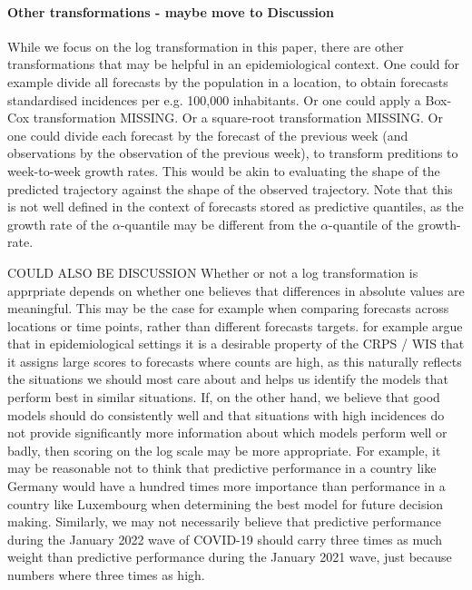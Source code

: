 \documentclass{article}
\begin{document}
\paragraph{Other transformations - maybe move to Discussion}
While we focus on the log transformation in this paper, there are other transformations that may be helpful in an epidemiological context. One could for example divide all forecasts by the population in a location, to obtain forecasts standardised incidences per e.g. 100,000 inhabitants. 
Or one could apply a Box-Cox transformation MISSING. 
Or a square-root transformation MISSING. 
Or one could divide each forecast by the forecast of the previous week (and observations by the observation of the previous week), to transform preditions to week-to-week growth rates. This would be akin to evaluating the shape of the predicted trajectory against the shape of the observed trajectory. Note that this is not well defined in the context of forecasts stored as predictive quantiles, as the growth rate of the $\alpha$-quantile may be different from the $\alpha$-quantile of the growth-rate. 



COULD ALSO BE DISCUSSION
Whether or not a log transformation is apprpriate depends on whether one believes that differences in absolute values are meaningful. This may be the case for example when comparing forecasts across locations or time points, rather than different forecasts targets. \cite{bracherEvaluatingEpidemicForecasts2021} for example argue that in epidemiological settings it is a desirable property of the CRPS / WIS that it assigns large scores to forecasts where counts are high, as this naturally reflects the situations we should most care about and helps us identify the models that perform best in similar situations. If, on the other hand, we believe that good models should do consistently well and that situations with high incidences do not provide significantly more information about which models perform well or badly, then scoring on the log scale may be more appropriate. For example, it may be reasonable not to think that predictive performance in a country like Germany would have a hundred times more importance than performance in a country like Luxembourg when determining the best model for future decision making. Similarly, we may not necessarily believe that predictive performance during the January 2022 wave of COVID-19 should carry three times as much weight than predictive performance during the January 2021 wave, just because numbers where three times as high. 
\end{document}
